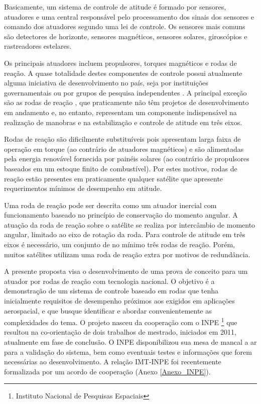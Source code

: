 Basicamente, um sistema de controle de atitude é formado por sensores, atuadores e uma central responsável pelo processamento dos sinais dos sensores e comando dos atuadores segundo uma lei de controle. Os sensores mais comuns são detectores de horizonte, sensores magnéticos, sensores solares, giroscópios e rastreadores estelares. 

Os principais atuadores incluem propulsores, torques magnéticos e rodas de reação. A quase totalidade destes componentes de controle possui atualmente alguma iniciativa de desenvolvimento no país, seja por instituições governamentais ou por grupos de pesquisa independentes \cite{pantojadesafios}. A principal exceção são as rodas de reação \cite{oland2009reaction, ge2006comparative}, que praticamente não têm projetos de  desenvolvimento em andamento e, no entanto, representam um componente indispensável na realização de manobras e na estabilização e controle de atitude em três eixos. 

Rodas de reação são dificilmente substituíveis pois apresentam larga faixa de operação em torque (ao contrário de atuadores magnéticos) e são alimentadas pela energia renovável fornecida por painéis solares (ao contrário de propulsores baseados em um estoque finito de combustível). Por estes motivos, rodas de reação estão presentes em praticamente qualquer satélite que apresente requerimentos mínimos de desempenho em atitude.

Uma roda de reação pode ser descrita como um atuador inercial com funcionamento baseado no princípio de conservação do momento angular. A atuação da roda de reação sobre o satélite se realiza por intercâmbio de momento angular, limitado ao eixo de rotação da roda. Para controle de atitude em três eixos é necessário, um conjunto de no mínimo três rodas de reação. Porém, muitos satélites utilizam uma roda de reação extra por motivos de redundância.

A presente proposta visa o desenvolvimento de uma prova de conceito para um atuador 
por rodas de reação com tecnologia nacional. O objetivo é a demonstração de um 
sistema de controle baseado em rodas que tenha inicialmente requisitos de desempenho 
próximos aos exigidos em aplicações aerospacial, e que busque identificar e abordar convenientemente as 
complexidades do tema. O projeto nasceu da cooperação com o INPE \footnote{Instituto 
Nacional de Pesquisas Espaciais} que resultou na co-orientação de dois trabalhos de mestrado, iniciados em 2011, atualmente em fase de conclusão. O INPE disponibilizou sua mesa de mancal a ar para a validação do sistema, bem como eventuais testes e informações que forem necessárias ao desenvolvimento. A relação IMT-INPE foi recentemente formalizada por um acordo de cooperação (Anexo  \ref{Anexo_INPE}).


